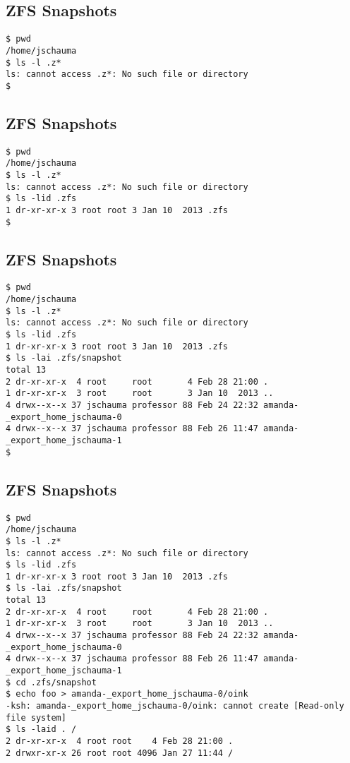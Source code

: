 \documentclass[xga]{xdvislides}
\begin{document}
\subsection{ZFS Snapshots}
\smallish
\begin{verbatim}
$ pwd
/home/jschauma
$ ls -l .z*
ls: cannot access .z*: No such file or directory
$
\end{verbatim}
\Normalsize

\subsection{ZFS Snapshots}
\smallish
\begin{verbatim}
$ pwd
/home/jschauma
$ ls -l .z*
ls: cannot access .z*: No such file or directory
$ ls -lid .zfs
1 dr-xr-xr-x 3 root root 3 Jan 10  2013 .zfs
$
\end{verbatim}
\Normalsize

\subsection{ZFS Snapshots}
\smallish
\begin{verbatim}
$ pwd
/home/jschauma
$ ls -l .z*
ls: cannot access .z*: No such file or directory
$ ls -lid .zfs
1 dr-xr-xr-x 3 root root 3 Jan 10  2013 .zfs
$ ls -lai .zfs/snapshot
total 13
2 dr-xr-xr-x  4 root     root       4 Feb 28 21:00 .
1 dr-xr-xr-x  3 root     root       3 Jan 10  2013 ..
4 drwx--x--x 37 jschauma professor 88 Feb 24 22:32 amanda-_export_home_jschauma-0
4 drwx--x--x 37 jschauma professor 88 Feb 26 11:47 amanda-_export_home_jschauma-1
$
\end{verbatim}
\Normalsize

\subsection{ZFS Snapshots}
\smallish
\begin{verbatim}
$ pwd
/home/jschauma
$ ls -l .z*
ls: cannot access .z*: No such file or directory
$ ls -lid .zfs
1 dr-xr-xr-x 3 root root 3 Jan 10  2013 .zfs
$ ls -lai .zfs/snapshot
total 13
2 dr-xr-xr-x  4 root     root       4 Feb 28 21:00 .
1 dr-xr-xr-x  3 root     root       3 Jan 10  2013 ..
4 drwx--x--x 37 jschauma professor 88 Feb 24 22:32 amanda-_export_home_jschauma-0
4 drwx--x--x 37 jschauma professor 88 Feb 26 11:47 amanda-_export_home_jschauma-1
$ cd .zfs/snapshot
$ echo foo > amanda-_export_home_jschauma-0/oink
-ksh: amanda-_export_home_jschauma-0/oink: cannot create [Read-only file system]
$ ls -laid . /
2 dr-xr-xr-x  4 root root    4 Feb 28 21:00 .
2 drwxr-xr-x 26 root root 4096 Jan 27 11:44 /
\end{verbatim}
\Normalsize
\end{document}
